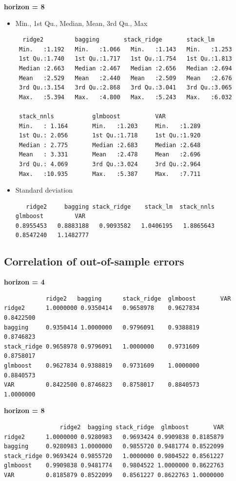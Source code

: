 \textbf{horizon = 8}

\begin{itemize}

\item Min., 1st Qu., Median, Mean, 3rd Qu., Max

\begin{verbatim}
  ridge2         bagging       stack_ridge       stack_lm
 Min.   :1.192   Min.   :1.066   Min.   :1.143   Min.   :1.253
 1st Qu.:1.740   1st Qu.:1.717   1st Qu.:1.754   1st Qu.:1.813
 Median :2.663   Median :2.467   Median :2.656   Median :2.694
 Mean   :2.529   Mean   :2.440   Mean   :2.509   Mean   :2.676
 3rd Qu.:3.154   3rd Qu.:2.868   3rd Qu.:3.041   3rd Qu.:3.065
 Max.   :5.394   Max.   :4.800   Max.   :5.243   Max.   :6.032

 stack_nnls           glmboost          VAR
 Min.   : 1.164       Min.   :1.203     Min.   :1.289
 1st Qu.: 2.056       1st Qu.:1.718     1st Qu.:1.920
 Median : 2.775       Median :2.683     Median :2.648
 Mean   : 3.331       Mean   :2.478     Mean   :2.696
 3rd Qu.: 4.069       3rd Qu.:3.024     3rd Qu.:2.964
 Max.   :10.935       Max.   :5.387     Max.   :7.711
\end{verbatim}

\item Standard deviation

\begin{verbatim}
   ridge2     bagging stack_ridge    stack_lm  stack_nnls    glmboost         VAR
0.8955453   0.8883188   0.9093582   1.0406195   1.8865643   0.8547240   1.1482777
\end{verbatim}

\end{itemize}

\subsection{Correlation of out-of-sample errors}
\label{oos_errors_cor}

\textbf{horizon = 4}

\begin{verbatim}
            ridge2   bagging      stack_ridge  glmboost       VAR
ridge2      1.0000000 0.9350414   0.9658978    0.9627834      0.8422500
bagging     0.9350414 1.0000000   0.9796091    0.9388819      0.8746823
stack_ridge 0.9658978 0.9796091   1.0000000    0.9731609      0.8758017
glmboost    0.9627834 0.9388819   0.9731609    1.0000000      0.8840573
VAR         0.8422500 0.8746823   0.8758017    0.8840573      1.0000000
\end{verbatim}

\textbf{horizon = 8}

\begin{verbatim}
                ridge2  bagging stack_ridge  glmboost       VAR
ridge2      1.0000000 0.9280983   0.9693424 0.9909838 0.8185879
bagging     0.9280983 1.0000000   0.9855720 0.9481774 0.8522099
stack_ridge 0.9693424 0.9855720   1.0000000 0.9804522 0.8561227
glmboost    0.9909838 0.9481774   0.9804522 1.0000000 0.8622763
VAR         0.8185879 0.8522099   0.8561227 0.8622763 1.0000000
\end{verbatim}

